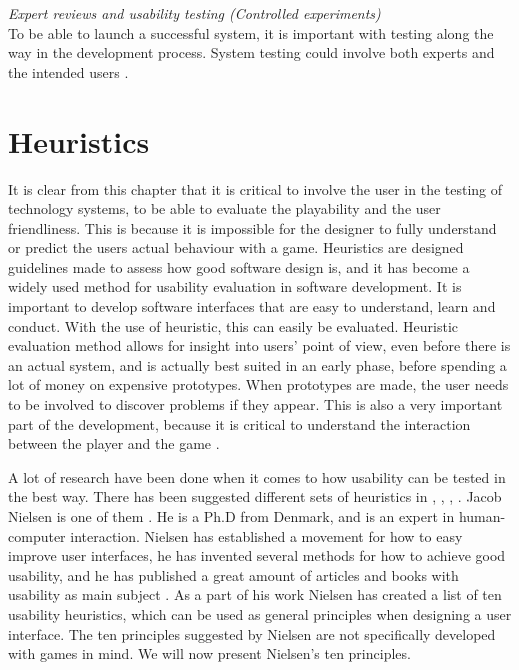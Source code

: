 \emph{Expert reviews and usability testing (Controlled experiments)}\\
To be able to launch a successful system, it is important with testing along the way in the development process. System testing could involve both experts and the intended users \cite{mmi}. 

\section{Heuristics}
It is clear from this chapter that it is critical to involve the user in the testing of technology systems, to be able to evaluate the playability and the user friendliness. This is because it is impossible for the designer to fully understand or predict the users actual behaviour with a game.  Heuristics are designed guidelines made to assess how good software design is, and it has become a widely used method for usability evaluation in software development. It is important to develop software interfaces that are easy to understand, learn and conduct. With the use of heuristic, this can easily be evaluated. Heuristic evaluation method allows for insight into users' point of view, even before there is an actual system, and is actually best suited in an early phase, before spending a lot of money on expensive prototypes. When prototypes are made, the user needs to be involved to discover problems if they appear. This is also a very important part of the development, because it is critical to understand the interaction between the player and the game \cite{desurvire}. 

A lot of research have been done when it comes to how usability can be tested in the best way. There has been suggested different sets of heuristics in \cite{nielsen2005ten}, \cite{malone}, \cite{shelley}, \cite{federoff}. Jacob Nielsen is one of them \cite{nielsen2005ten}. He is a Ph.D from Denmark, and is an expert in human-computer interaction. Nielsen has established a movement for how to easy improve user interfaces, he has invented several methods for how to achieve good usability, and he has published a great amount of articles and books with usability as main subject \cite{JNielsen}. As a part of his work Nielsen has created a list of ten usability heuristics, which can be used as general principles when designing a user interface\cite{nielsen2005ten}. The ten principles suggested by Nielsen are not specifically developed with games in mind. We will now present Nielsen's ten principles.
 
